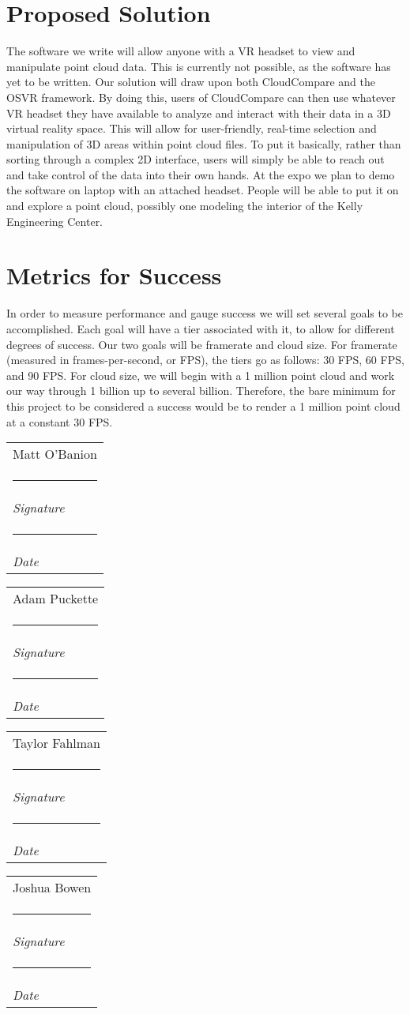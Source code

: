 \documentclass{article}
\makeatletter
\newcommand{\namesigdate}[2][5cm]{%
  \begin{tabular}{@{}p{#1}@{}}
    #2 \\[2\normalbaselineskip] \hrule \\[0pt]
    {\small \textit{Signature}} \\[2\normalbaselineskip] \hrule \\[0pt]
    {\small \textit{Date}}
  \end{tabular}
}
\makeatother
\begin{document}
\section*{Proposed Solution}

The software we write will allow anyone with a VR headset to view and manipulate point cloud data. This is currently not possible, as the software has yet to be written. Our solution will draw upon both CloudCompare and the OSVR framework. By doing this, users of CloudCompare can then use whatever VR headset they have available to analyze and interact with their data in a 3D virtual reality space. This will allow for user-friendly, real-time selection and manipulation of 3D areas within point cloud files. To put it basically, rather than sorting through a complex 2D interface, users will simply be able to reach out and take control of the data into their own hands. At the expo we plan to demo the software on laptop with an attached headset. People will be able to put it on and explore a point cloud, possibly one modeling the interior of the Kelly Engineering Center. 

\section*{Metrics for Success}

In order to measure performance and gauge success we will set several goals to be accomplished. Each goal will have a tier associated with it, to allow for different degrees of success. Our two goals will be framerate and cloud size. For framerate (measured in frames-per-second, or FPS), the tiers go as follows: 30 FPS, 60 FPS, and 90 FPS. For cloud size, we will begin with a 1 million point cloud and work our way through 1 billion up to several billion. Therefore, the bare minimum for this project to be considered a success would be to render a 1 million point cloud at a constant 30 FPS. 

\vspace{2pc}

\noindent \namesigdate{Matt O'Banion} \hfill \namesigdate[3cm]{Adam Puckette}

\vspace{2pc}

\noindent \namesigdate{Taylor Fahlman} \hfill \namesigdate[3cm]{Joshua Bowen}
\end{document}
